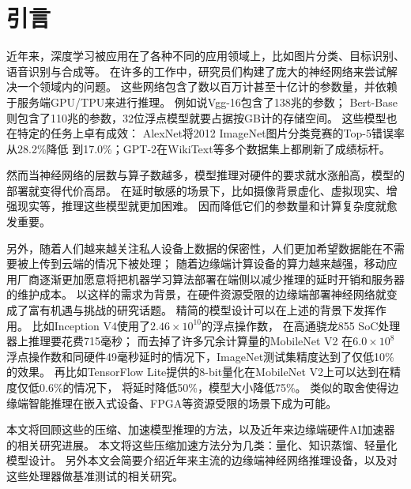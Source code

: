 \section{引言}
近年来，深度学习被应用在了各种不同的应用领域上，比如图片分类、目标识别、语音识别与合成等。
在许多的工作中，研究员们构建了庞大的神经网络来尝试解决一个领域内的问题。
这些网络包含了数以百万计甚至十亿计的参数量，并依赖于服务端GPU/TPU来进行推理。
例如说Vgg-16\cite{simonyan2014very}包含了138兆的参数；
Bert-Base\cite{devlin2018bert}则包含了110兆的参数，32位浮点模型就要占据按GB计的存储空间。
这些模型也在特定的任务上卓有成效：
AlexNet\cite{krizhevsky2012imagenet}将2012 ImageNet\cite{deng2009imagenet}图片分类竞赛的Top-5错误率从28.2\%降低
到17.0\%；GPT-2\cite{radford2019language}在WikiText等多个数据集上都刷新了成绩标杆。

然而当神经网络的层数与算子数越多，模型推理对硬件的要求就水涨船高，模型的部署就变得代价高昂。
在延时敏感的场景下，比如摄像背景虚化、虚拟现实、增强现实等，推理这些模型就更加困难。
因而降低它们的参数量和计算复杂度就愈发重要。

另外，随着人们越来越关注私人设备上数据的保密性，人们更加希望数据能在不需要被上传到云端的情况下被处理；
随着边缘端计算设备的算力越来越强，移动应用厂商逐渐更加愿意将把机器学习算法部署在端侧以减少推理的延时开销和服务器的维护成本。
以这样的需求为背景，在硬件资源受限的边缘端部署神经网络就变成了富有机遇与挑战的研究话题。
精简的模型设计可以在上述的背景下发挥作用。
比如Inception V4\cite{szegedy2017inception}使用了$2.46\times 10^{10}$的浮点操作数，
在高通骁龙855 SoC处理器上推理要花费715毫秒；
而去掉了许多冗余计算量的MobileNet V2\cite{sandler2018mobilenetv2}
在$6.0\times 10^8$浮点操作数和同硬件49毫秒延时的情况下，ImageNet测试集精度达到了仅低10\%的效果。
再比如TensorFlow Lite提供的8-bit量化在MobileNet V2上可以达到在精度仅低0.6\%的情况下，
将延时降低50\%，模型大小降低75\%。
类似的取舍使得边缘端智能推理在嵌入式设备、FPGA等资源受限的场景下成为可能。

本文将回顾这些的压缩、加速模型推理的方法，以及近年来边缘端硬件AI加速器的相关研究进展。
本文将这些压缩加速方法分为几类：量化、知识蒸馏、轻量化模型设计。
另外本文会简要介绍近年来主流的边缘端神经网络推理设备，以及对这些处理器做基准测试的相关研究。